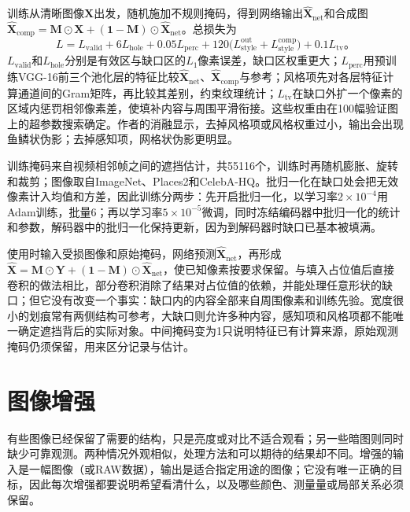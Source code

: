 训练从清晰图像$\bm{X}$出发，随机施加不规则掩码，得到网络输出$\widehat{\bm{X}}_{\mathrm{net}}$和合成图$\widehat{\bm{X}}_{\mathrm{comp}}=\bm{M}\odot\bm{X}+(\bm{1}-\bm{M})\odot\widehat{\bm{X}}_{\mathrm{net}}$。总损失为
\begin{equation}
 L=L_{\mathrm{valid}}+6L_{\mathrm{hole}}+0.05L_{\mathrm{perc}}
   +120\bigl(L_{\mathrm{style}}^{\mathrm{out}}+L_{\mathrm{style}}^{\mathrm{comp}}\bigr)
   +0.1L_{\mathrm{tv}}\text{。}
 \label{eq:vision-pconv-loss}
\end{equation}
$L_{\mathrm{valid}}$和$L_{\mathrm{hole}}$分别是有效区与缺口区的$L_1$像素误差，缺口区权重更大；$L_{\mathrm{perc}}$用预训练VGG-16前三个池化层的特征比较$\widehat{\bm{X}}_{\mathrm{net}}$、$\widehat{\bm{X}}_{\mathrm{comp}}$与参考；风格项先对各层特征计算通道间的Gram矩阵，再比较其差别，约束纹理统计；$L_{\mathrm{tv}}$在缺口外扩一个像素的区域内惩罚相邻像素差，使填补内容与周围平滑衔接。这些权重由在100幅验证图上的超参数搜索确定。作者的消融显示，去掉风格项或风格权重过小，输出会出现鱼鳞状伪影；去掉感知项，网格状伪影更明显。

训练掩码来自视频相邻帧之间的遮挡估计，共55116个，训练时再随机膨胀、旋转和裁剪；图像取自ImageNet、Places2和CelebA-HQ。批归一化在缺口处会把无效像素计入均值和方差，因此训练分两步：先开启批归一化，以学习率$2\times10^{-4}$用Adam训练，批量6；再以学习率$5\times10^{-5}$微调，同时冻结编码器中批归一化的统计和参数，解码器中的批归一化保持更新，因为到解码器时缺口已基本被填满。

使用时输入受损图像和原始掩码，网络预测$\widehat{\bm{X}}_{\mathrm{net}}$，再形成
$\widehat{\bm{X}}=\bm{M}\odot\bm{Y}+(\bm{1}-\bm{M})\odot\widehat{\bm{X}}_{\mathrm{net}}$，使已知像素按要求保留。与填入占位值后直接卷积的做法相比，部分卷积消除了结果对占位值的依赖，并能处理任意形状的缺口；但它没有改变一个事实：缺口内的内容全部来自周围像素和训练先验。宽度很小的划痕常有两侧结构可参考，大缺口则允许多种内容，感知项和风格项都不能唯一确定遮挡背后的实际对象。中间掩码变为1只说明特征已有计算来源，原始观测掩码仍须保留，用来区分记录与估计。

\section{图像增强}
\label{sec:vision-restoration-enhancement}

有些图像已经保留了需要的结构，只是亮度或对比不适合观看；另一些暗图则同时缺少可靠观测。两种情况外观相似，处理方法和可以期待的结果却不同。增强的输入是一幅图像（或RAW数据），输出是适合指定用途的图像；它没有唯一正确的目标，因此每次增强都要说明希望看清什么，以及哪些颜色、测量量或局部关系必须保留。

